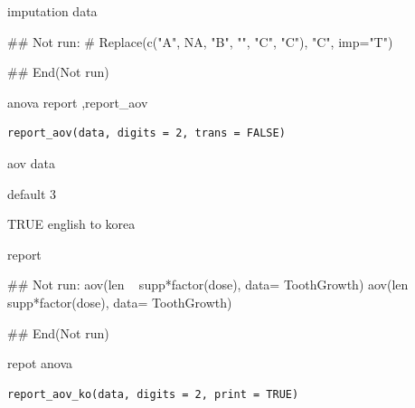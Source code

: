\documentclass[a4paper]{book}
\begin{document}
%
\begin{Value}
imputation data
\end{Value}
%
\begin{Examples}
\begin{ExampleCode}

## Not run: 
# Replace(c("A", NA, "B", "", "C", "C"), "C", imp="T")

## End(Not run)

\end{ExampleCode}
\end{Examples}
%
\begin{Description}
anova report ,report\_aov
\end{Description}
%
\begin{Usage}
\begin{verbatim}
report_aov(data, digits = 2, trans = FALSE)
\end{verbatim}
\end{Usage}
%
\begin{Arguments}
\begin{ldescription}
\item[\code{data}] aov data

\item[\code{digits}] default 3

\item[\code{trans}] TRUE english to korea
\end{ldescription}
\end{Arguments}
%
\begin{Value}
report
\end{Value}
%
\begin{Examples}
\begin{ExampleCode}
## Not run: 
aov(len ~ supp*factor(dose), data= ToothGrowth) %
aov(len ~ supp*factor(dose), data= ToothGrowth) %



## End(Not run)


\end{ExampleCode}
\end{Examples}
%
\begin{Description}
repot anova
\end{Description}
%
\begin{Usage}
\begin{verbatim}
report_aov_ko(data, digits = 2, print = TRUE)
\end{verbatim}
\end{Usage}
\end{document}
